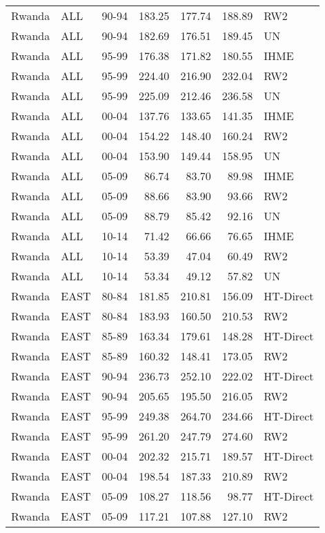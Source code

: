 \begin{longtable}{lllrrrl}
  Rwanda & ALL & 90-94 & 183.25 & 177.74 & 188.89 & RW2 \\ 
  Rwanda & ALL & 90-94 & 182.69 & 176.51 & 189.45 & UN \\ 
  Rwanda & ALL & 95-99 & 176.38 & 171.82 & 180.55 & IHME \\ 
  Rwanda & ALL & 95-99 & 224.40 & 216.90 & 232.04 & RW2 \\ 
  Rwanda & ALL & 95-99 & 225.09 & 212.46 & 236.58 & UN \\ 
  Rwanda & ALL & 00-04 & 137.76 & 133.65 & 141.35 & IHME \\ 
  Rwanda & ALL & 00-04 & 154.22 & 148.40 & 160.24 & RW2 \\ 
  Rwanda & ALL & 00-04 & 153.90 & 149.44 & 158.95 & UN \\ 
  Rwanda & ALL & 05-09 & 86.74 & 83.70 & 89.98 & IHME \\ 
  Rwanda & ALL & 05-09 & 88.66 & 83.90 & 93.66 & RW2 \\ 
  Rwanda & ALL & 05-09 & 88.79 & 85.42 & 92.16 & UN \\ 
  Rwanda & ALL & 10-14 & 71.42 & 66.66 & 76.65 & IHME \\ 
  Rwanda & ALL & 10-14 & 53.39 & 47.04 & 60.49 & RW2 \\ 
  Rwanda & ALL & 10-14 & 53.34 & 49.12 & 57.82 & UN \\ 
  Rwanda & EAST & 80-84 & 181.85 & 210.81 & 156.09 & HT-Direct \\ 
  Rwanda & EAST & 80-84 & 183.93 & 160.50 & 210.53 & RW2 \\ 
  Rwanda & EAST & 85-89 & 163.34 & 179.61 & 148.28 & HT-Direct \\ 
  Rwanda & EAST & 85-89 & 160.32 & 148.41 & 173.05 & RW2 \\ 
  Rwanda & EAST & 90-94 & 236.73 & 252.10 & 222.02 & HT-Direct \\ 
  Rwanda & EAST & 90-94 & 205.65 & 195.50 & 216.05 & RW2 \\ 
  Rwanda & EAST & 95-99 & 249.38 & 264.70 & 234.66 & HT-Direct \\ 
  Rwanda & EAST & 95-99 & 261.20 & 247.79 & 274.60 & RW2 \\ 
  Rwanda & EAST & 00-04 & 202.32 & 215.71 & 189.57 & HT-Direct \\ 
  Rwanda & EAST & 00-04 & 198.54 & 187.33 & 210.89 & RW2 \\ 
  Rwanda & EAST & 05-09 & 108.27 & 118.56 & 98.77 & HT-Direct \\ 
  Rwanda & EAST & 05-09 & 117.21 & 107.88 & 127.10 & RW2 \\ 

\end{longtable}

